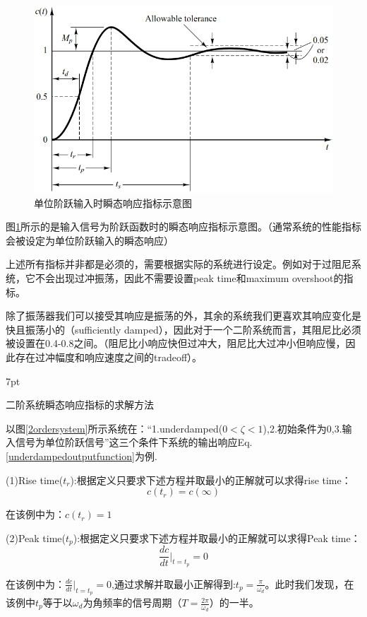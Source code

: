 \documentclass{article}
\numberwithin{equation}{section}
\numberwithin{figure}{section}
\newenvironment{formal}{%
\def\FrameCommand{%
\hspace{1pt}%
{\color{DarkBlue}\vrule width 2pt}%
{\color{formalshade}\vrule width 4pt}%
\colorbox{formalshade}%
}%
\MakeFramed{\advance\hsize-\width\FrameRestore}%
\noindent\hspace{-4.55pt}%
\begin{adjustwidth}{}{7pt}%
\vspace{2pt}\vspace{2pt}%
}
{%
\vspace{2pt}\end{adjustwidth}\endMakeFramed%
}
\begin{document}
\begin{figure}
    \centering
    \includegraphics[width=.6\textwidth]{Chapter5/TransientResponseSpecification.png} %
    \caption{单位阶跃输入时瞬态响应指标示意图} %
    \label{TransientResponseSpecification} %
\end{figure}

图\ref{TransientResponseSpecification}所示的是输入信号为阶跃函数时的瞬态响应指标示意图。（通常系统的性能指标会被设定为单位阶跃输入的瞬态响应）

上述所有指标并非都是必须的，需要根据实际的系统进行设定。例如对于过阻尼系统，它不会出现过冲振荡，因此不需要设置peak time和maximum overshoot的指标。

除了振荡器我们可以接受其响应是振荡的外，其余的系统我们更喜欢其响应变化是快且振荡小的（sufficiently damped），因此对于一个二阶系统而言，其阻尼比必须被设置在0.4-0.8之间。（阻尼比小响应快但过冲大，阻尼比大过冲小但响应慢，因此存在过冲幅度和响应速度之间的tradeoff）。

\begin{formal}
    二阶系统瞬态响应指标的求解方法
\end{formal}

以图\ref{2ordersystem}所示系统在：“1.underdamped($0<\zeta<1$),2.初始条件为0,3.输入信号为单位阶跃信号”这三个条件下系统的输出响应Eq.\ref{underdampedoutputfunction}为例.

(1)Rise time($t_r$):根据定义只要求下述方程并取最小的正解就可以求得rise time：
\begin{equation}
    c(t_r)=c(∞)
\end{equation}

在该例中为：$c(t_r)=1$

(2)Peak time($t_p$):根据定义只要求下述方程并取最小的正解就可以求得Peak time：
\begin{equation}
    \frac{dc}{dt}|_{t=t_p}=0
\end{equation}

在该例中为：$\frac{dc}{dt}|_{t=t_p}=0$,通过求解并取最小正解得到:$t_p=\frac{\pi}{\omega_d}$。此时我们发现，在该例中$t_p$等于以$\omega_d$为角频率的信号周期（$T=\frac{2\pi}{\omega_d}$）的一半。
\end{document}
